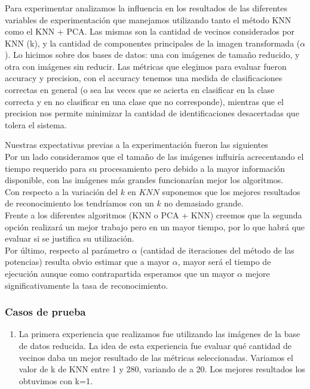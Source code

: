 \subsubsection*{}
Para experimentar analizamos la influencia en los resultados de las diferentes variables de experimentación que manejamos utilizando tanto el método KNN como el KNN + PCA. 
Las mismas son la cantidad de vecinos considerados por KNN (k), y la cantidad de componentes principales de la imagen transformada ($\alpha$).
Lo hicimos sobre dos bases de datos: una con im\'agenes de tamaño reducido, y otra con imágenes sin reducir.
Las métricas que elegimos para evaluar fueron accuracy y precision, con el accuracy tenemos una medida de clasificaciones correctas en general (o sea las veces que se acierta en clasificar en la clase correcta y en no clasificar en una clase que no corresponde), mientras que el precision nos permite minimizar la cantidad de identificaciones desacertadas que tolera el sistema.

\par Nuestras expectativas previas a la experimentación fueron las siguientes\\
Por un lado consideramos que el tamaño de las im\'agenes influiría acrecentando el tiempo requerido para su procesamiento pero debido a la mayor informaci\'on disponible, con las imágenes más grandes 
funcionarían mejor los algoritmos.\\
Con respecto a la variaci\'on del $k$ en $KNN$ suponemos que los mejores resultados de reconocimiento los tendríamos con un $k$ no demasiado grande.\\
Frente a los diferentes algoritmos (KNN o PCA + KNN) creemos que la segunda opci\'on realizar\'a un mejor trabajo pero en un mayor tiempo, por lo que habr\'a que evaluar si se justifica su utilizaci\'on.\\
Por \'ultimo, respecto al par\'ametro $\alpha$ (cantidad de iteraciones del m\'etodo de las potencias) resulta obvio estimar que a mayor $\alpha$, mayor ser\'a el tiempo de ejecución aunque como contrapartida esperamos que un mayor $\alpha$ mejore significativamente la tasa de reconocimiento.

\subsubsection*{Casos de prueba}

\begin{enumerate}
\item La primera experiencia que realizamos fue utilizando las imágenes de la base de datos reducida. La idea de esta experiencia fue evaluar qué cantidad de vecinos daba un mejor resultado de las métricas seleccionadas. Variamos el valor de k de KNN entre 1 y 280, variando de a 20. Los mejores resultados los obtuvimos con k=1.
\end{enumerate}
